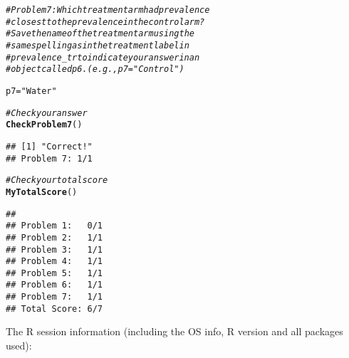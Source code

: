 \documentclass{article}\usepackage[]{graphicx}\usepackage[]{color}
\makeatletter
\newcommand{\hlstr}[1]{\textcolor[rgb]{0.192,0.494,0.8}{#1}}%
\newcommand{\hlcom}[1]{\textcolor[rgb]{0.678,0.584,0.686}{\textit{#1}}}%
\newcommand{\hlstd}[1]{\textcolor[rgb]{0.345,0.345,0.345}{#1}}%
\newcommand{\hlkwb}[1]{\textcolor[rgb]{0.69,0.353,0.396}{#1}}%
\newcommand{\hlkwd}[1]{\textcolor[rgb]{0.737,0.353,0.396}{\textbf{#1}}}%
\newenvironment{kframe}{%
 \def\at@end@of@kframe{}%
 \ifinner\ifhmode%
  \def\at@end@of@kframe{\end{minipage}}%
  \begin{minipage}{\columnwidth}%
 \fi\fi%
 \def\FrameCommand##1{\hskip\@totalleftmargin \hskip-\fboxsep
 \colorbox{shadecolor}{##1}\hskip-\fboxsep
     \hskip-\linewidth \hskip-\@totalleftmargin \hskip\columnwidth}%
 \MakeFramed {\advance\hsize-\width
   \@totalleftmargin\z@ \linewidth\hsize
   \@setminipage}}%
 {\par\unskip\endMakeFramed%
 \at@end@of@kframe}
\newenvironment{knitrout}{}{} %
\makeatother
\begin{document}
\begin{knitrout}
\color{fgcolor}\begin{kframe}
\begin{alltt}
\hlcom{# Problem 7: Which treatment arm had prevalence}
\hlcom{# closest to the prevalence in the control arm? }
\hlcom{# Save the name of the treatment arm using the}
\hlcom{# same spelling as in the treatment label in }
\hlcom{# prevalence_tr to indicate your answer in an}
\hlcom{# object called p6. (e.g., p7 = "Control")}
\end{alltt}
\end{kframe}
\end{knitrout}
\begin{knitrout}
\color{fgcolor}\begin{kframe}
\begin{alltt}
\hlstd{p7} \hlkwb{=} \hlstr{"Water"}

\hlcom{# Check your answer}
\hlkwd{CheckProblem7}\hlstd{()}
\end{alltt}
\begin{verbatim}
## [1] "Correct!"
## Problem 7: 1/1
\end{verbatim}
\end{kframe}
\end{knitrout}
\begin{knitrout}
\color{fgcolor}\begin{kframe}
\begin{alltt}
\hlcom{# Check your total score}
\hlkwd{MyTotalScore}\hlstd{()}
\end{alltt}
\begin{verbatim}
##                 
## Problem 1:   0/1
## Problem 2:   1/1
## Problem 3:   1/1
## Problem 4:   1/1
## Problem 5:   1/1
## Problem 6:   1/1
## Problem 7:   1/1
## Total Score: 6/7
\end{verbatim}
\end{kframe}
\end{knitrout}


The R session information (including the OS info, R version and all
packages used):
\end{document}
